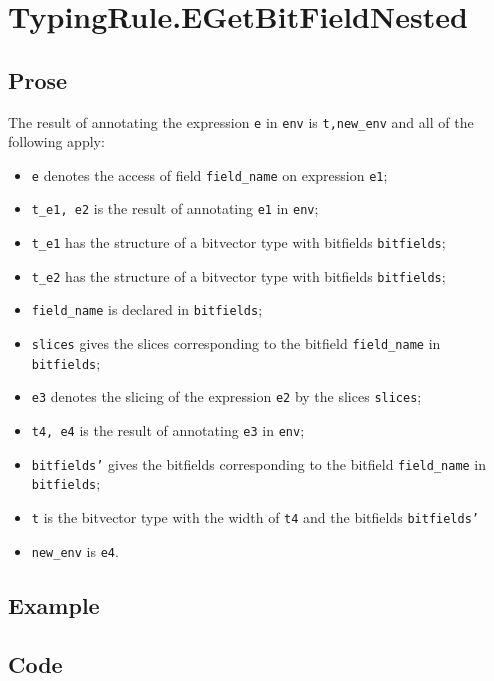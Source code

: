 \documentclass{book}
\begin{document}
\section{TypingRule.EGetBitFieldNested \label{sec:TypingRule.EGetBitFieldNested}}

  \subsection{Prose}
  The result of annotating the expression \texttt{e} in \texttt{env} is
\texttt{t,new\_env} and all of the following apply:
  \begin{itemize}
  \item \texttt{e} denotes the access of field \texttt{field\_name} on expression \texttt{e1};
  \item \texttt{t\_e1, e2} is the result of annotating \texttt{e1} in \texttt{env};
  \item \texttt{t\_e1} has the structure of a bitvector type with bitfields \texttt{bitfields};
  \item \texttt{t\_e2} has the structure of a bitvector type with bitfields \texttt{bitfields};
  \item \texttt{field\_name} is declared in \texttt{bitfields};
  \item \texttt{slices} gives the slices corresponding to the bitfield \texttt{field\_name} in
    \texttt{bitfields};
  \item \texttt{e3} denotes the slicing of the expression \texttt{e2} by the slices \texttt{slices};
  \item \texttt{t4, e4} is the result of annotating \texttt{e3} in \texttt{env};
  \item \texttt{bitfields'} gives the bitfields corresponding to the bitfield \texttt{field\_name}
    in \texttt{bitfields};
  \item \texttt{t} is the bitvector type with the width of \texttt{t4} and the bitfields \texttt{bitfields'}
  \item \texttt{new\_env} is \texttt{e4}.
  \end{itemize}

  \subsection{Example}

  \subsection{Code}
\end{document}
